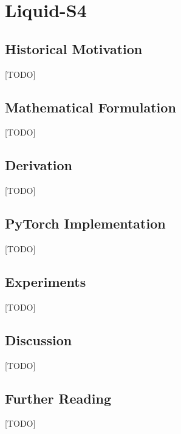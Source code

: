 
\chapter{Liquid-S4}
\label{ch:14_liquid_s4}


\section{Historical Motivation}
[TODO]

\section{Mathematical Formulation}
[TODO]

\section{Derivation}
[TODO]

\section{PyTorch Implementation}
[TODO]

\section{Experiments}
[TODO]

\section{Discussion}
[TODO]

\section{Further Reading}
[TODO]
